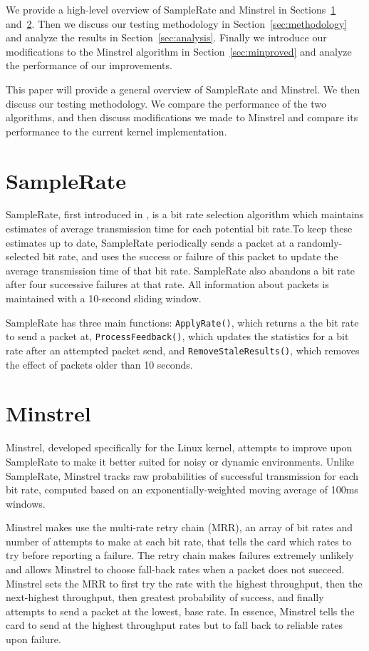 \documentclass[twocolumn,10pt]{article}
\begin{document}
We provide a high-level overview of SampleRate and Minstrel in
Sections~\ref{sec:samplerate} and~\ref{sec:minstrel}.  Then we discuss
our testing methodology in Section~\ref{sec:methodology} and analyze
the results in Section~\ref{sec:analysis}.  Finally we introduce our
modifications to the Minstrel algorithm in Section~\ref{sec:minproved}
and analyze the performance of our improvements.

This paper will provide a general overview of SampleRate and Minstrel.
We then discuss our testing methodology.  We compare the performance
of the two algorithms, and then discuss modifications we made to
Minstrel and compare its performance to the current kernel
implementation.


\section{SampleRate} \label{sec:samplerate}

SampleRate, first introduced in \cite{samplerate}, is a bit rate
selection algorithm which maintains estimates of average transmission
time for each potential bit rate.To keep these estimates up to date,
SampleRate periodically sends a packet at a randomly-selected bit
rate, and uses the success or failure of this packet to update the
average transmission time of that bit rate.  SampleRate also abandons
a bit rate after four successive failures at that rate.  All
information about packets is maintained with a 10-second sliding window.

SampleRate has three main functions: \texttt{ApplyRate()}, which
returns a the bit rate to send a packet at,
\texttt{ProcessFeedback()}, which updates the statistics for a
bit rate after an attempted packet send, and
\texttt{RemoveStaleResults()}, which removes the effect of packets
older than 10 seconds.

\section{Minstrel} \label{sec:minstrel}

Minstrel, developed specifically for the Linux kernel, attempts to
improve upon SampleRate to make it better suited for noisy or
dynamic environments.  Unlike SampleRate, Minstrel tracks raw
probabilities of successful transmission for each bit rate, computed
based on an exponentially-weighted moving average of 100ms windows.

Minstrel makes use the multi-rate retry chain (MRR), an array of bit rates
and number of attempts to make at each bit rate, that tells the card
which rates to try before reporting a failure.  The retry chain makes
failures extremely unlikely and allows Minstrel to choose fall-back
rates when a packet does not succeed.  Minstrel sets the MRR to first
try the rate with the highest throughput, then the next-highest
throughput, then greatest probability of success, and finally attempts
to send a packet at the lowest, base rate.  In essence, Minstrel tells
the card to send at the highest throughput rates but to fall back to
reliable rates upon failure.
\end{document}
